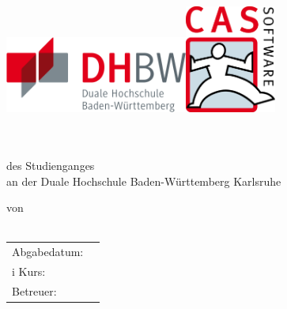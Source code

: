 
\newcommand{\logodhbw}{\includegraphics[width=6cm]{kapitel/0_offizielles/img/dhbw}}
\newcommand{\logocas}{\includegraphics[width=3cm]{kapitel/0_offizielles/img/cas}}

\begin{titlepage}
	\sffamily
	
	\logodhbw \hfill \logocas \\[2ex]
	
	\begin{center}
		\huge{\textsc{\textbf{\theTitle}}}
		\\[6ex]
		\Large{\textbf{\theSubtitle}}
		\\
		\Large{des Studienganges \studiengang}
		\\
		\Large{an der Duale Hochschule Baden-Württemberg Karlsruhe}
		\\[7ex]
		
		\normalsize{
			von
			\\
			\theAuthor
			\\[15ex]
			
			\begin{tabular}{ll}
				Abgabedatum:		& \quad \deadline \\
i				Kurs:				& \quad \kurs \\ 
				Betreuer:			& \quad \supervisor \\
			\end{tabular}
		}
	\end{center}
\end{titlepage}